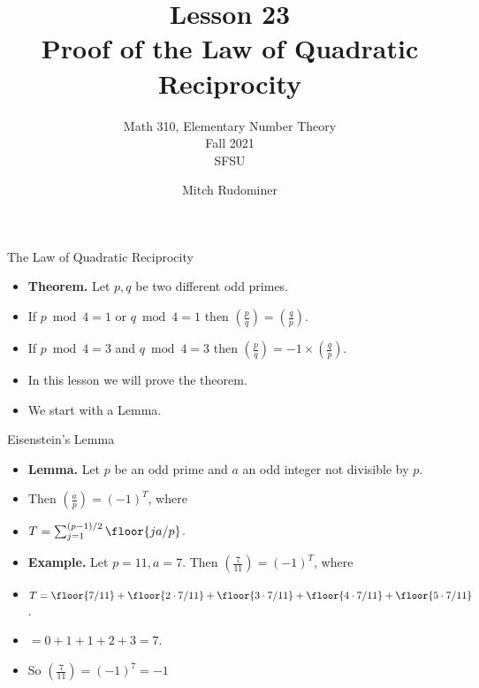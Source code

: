 \documentclass{beamer}
\title{Lesson 23 \\ Proof of the Law of Quadratic Reciprocity}
\subtitle{Math 310, Elementary Number Theory \\ Fall 2021 \\ SFSU}
\author{Mitch Rudominer}
\date{}
\begin{document}
\begin{frame}
  \titlepage
\end{frame}


\begin{frame}{The Law of Quadratic Reciprocity}

\begin{itemize}
  \item \textbf{Theorem.} Let $p,q$ be two different odd primes.
  \item If $p\bmod 4 = 1$ or $q\bmod 4 = 1$ then $(\frac{p}{q}) = (\frac{q}{p})$.
  \item If $p\bmod 4 = 3$ and $q\bmod 4 = 3$ then $(\frac{p}{q}) = -1 \times (\frac{q}{p})$.
  \item In this lesson we will prove the theorem.
  \item We start with a Lemma.
\end{itemize}
\end{frame}


\begin{frame}{Eisenstein's Lemma}

\begin{itemize}
  \item \textbf{Lemma.} Let $p$ be an odd prime and $a$ an odd integer not divisible by $p$.
  \item Then $\left ( \frac{a}{p}\right) = (-1)^T$, where
  \item $T = \sum_{j=1}^{(p-1)/2} \floor{ja/p}$.
  \item \textbf{Example.} Let $p=11, a=7$. Then $\left ( \frac{7}{11}\right) = (-1)^T$, where
  \item $T = \floor{7/11} + \floor{2\cdot7/11} + \floor{3\cdot7/11}  + \floor{4\cdot7/11}  + \floor{5\cdot7/11}$.
  \item $= 0 + 1 + 1 +2 +3 = 7$.
  \item So  $\left ( \frac{7}{11}\right) = (-1)^7 = -1$
\end{itemize}
\end{frame}

\end{document}
